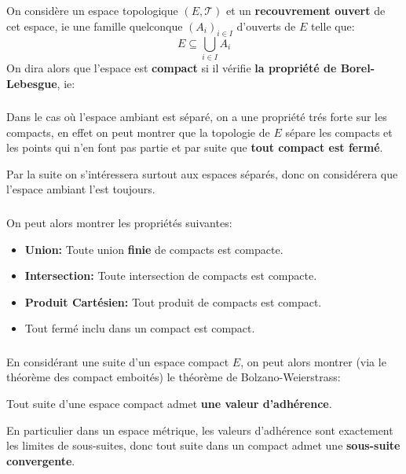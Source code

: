 \chapter*{}
On considère un espace topologique \((E, \mathcal{T})\) et un \textbf{recouvrement ouvert} de cet espace, ie une famille quelconque \((A_i)_{i \in I}\) d'ouverts de \(E\) telle que:
\[
   E \subseteq \bigcup_{i \in I} A_i  
\]
On dira alors que l'espace est \textbf{compact} si il vérifie \textbf{la propriété de Borel-Lebesgue}, ie:
\subsection*{}
Dans le cas où l'espace ambiant est séparé, on a une propriété trés forte sur les compacts, en effet on peut montrer que la topologie de \( E \) sépare les compacts et les points qui n'en font pas partie et par suite que \textbf{tout compact est fermé}.\<

Par la suite on s'intéressera surtout aux espaces séparés, donc on considérera que l'espace ambiant l'est toujours.
\subsection*{}
On peut alors montrer les propriétés suivantes:
\begin{itemize}
   \item \textbf{Union:} Toute union \textbf{finie} de compacts est compacte.
   \item \textbf{Intersection:} Toute intersection de compacts est compacte.
   \item \textbf{Produit Cartésien:} Tout produit de compacts est compact.
   \item Tout fermé inclu dans un compact est compact.
\end{itemize}
\subsection*{}
En considérant une suite d'un espace compact \( E \), on peut alors montrer (via le théorème des compact emboités) le théorème de Bolzano-Weierstrass:
\begin{center}
   Tout suite d'une espace compact admet \textbf{une valeur d'adhérence}.
\end{center}
En particulier dans un espace métrique, les valeurs d'adhérence sont exactement les limites de sous-suites, donc tout suite dans un compact admet une \textbf{sous-suite convergente}.
